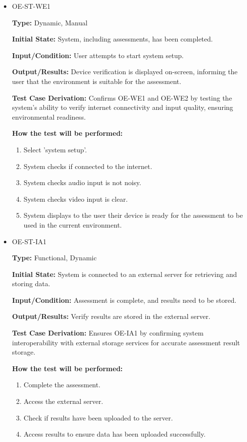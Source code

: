 \documentclass[12pt, titlepage]{article}
\begin{document}
\begin{itemize}
  \item OE-ST-WE1
  \begin{mdframed}[linewidth=0.5mm]
      \textbf{Type:} Dynamic, Manual \par
      \textbf{Initial State:} System, including assessments, has been completed. \par
      \textbf{Input/Condition:} User attempts to start system setup. \par
      \textbf{Output/Results:} Device verification is displayed on-screen, informing the user that the environment is suitable for the assessment. \par
      \textbf{Test Case Derivation:} Confirms OE-WE1 and OE-WE2 by testing the system’s ability to verify internet connectivity and input quality, ensuring environmental readiness. \par
      \textbf{How the test will be performed:}
      \begin{enumerate}[noitemsep]
        \item Select 'system setup'.
        \item System checks if connected to the internet.
        \item System checks audio input is not noisy.
        \item System checks video input is clear.
        \item System displays to the user their device is ready for the assessment to be used in the current environment.
      \end{enumerate}
  \end{mdframed}

  \item OE-ST-IA1
  \begin{mdframed}[linewidth=0.5mm]
      \textbf{Type:} Functional, Dynamic \par
      \textbf{Initial State:} System is connected to an external server for retrieving and storing data. \par
      \textbf{Input/Condition:} Assessment is complete, and results need to be stored. \par
      \textbf{Output/Results:} Verify results are stored in the external server. \par
      \textbf{Test Case Derivation:} Ensures OE-IA1 by confirming system interoperability with external storage services for accurate assessment result storage. \par
      \textbf{How the test will be performed:}
      \begin{enumerate}[noitemsep]
        \item Complete the assessment.
        \item Access the external server.
        \item Check if results have been uploaded to the server.
        \item Access results to ensure data has been uploaded successfully.
      \end{enumerate}
  \end{mdframed}
\end{itemize}
\end{document}
